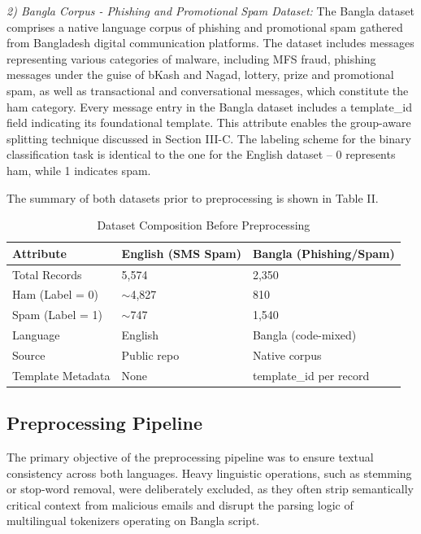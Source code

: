 \documentclass[journal]{IEEEtran}
\begin{document}
\textit{2) Bangla Corpus - Phishing and Promotional Spam Dataset:} The
Bangla dataset comprises a native language corpus of phishing and
promotional spam gathered from Bangladesh digital communication
platforms. The dataset includes messages representing various
categories of malware, including MFS fraud, phishing messages under the
guise of bKash and Nagad, lottery, prize and promotional spam, as well
as transactional and conversational messages, which constitute the ham
category. Every message entry in the Bangla dataset includes a template\_id field indicating its foundational template. This attribute enables the group-aware
splitting technique discussed in Section III-C. The labeling scheme for
the binary classification task is identical to the one for the English
dataset -- 0 represents ham, while 1 indicates spam.

The summary of both datasets prior to preprocessing is shown in Table
II.

\begin{table}[htbp]
\caption{Dataset Composition Before Preprocessing}
\label{tab:dataset_raw}
\centering
\begin{tabular}{lll}
\toprule
\textbf{Attribute} & \textbf{English (SMS Spam)} & \textbf{Bangla (Phishing/Spam)} \\
\midrule
Total Records & 5,574 & 2,350 \\
Ham (Label = 0) & $\sim$4,827 & 810 \\
Spam (Label = 1) & $\sim$747 & 1,540 \\
Language & English & Bangla (code-mixed) \\
Source & Public repo \cite{ref1} & Native corpus \\
Template Metadata & None & template\_id per record \\
\bottomrule
\end{tabular}
\end{table}

\subsection{Preprocessing Pipeline}

The primary objective of the preprocessing pipeline was to ensure textual consistency across both languages. Heavy linguistic operations, such as stemming or stop-word removal, were deliberately excluded, as they often strip semantically critical context from malicious emails and disrupt the parsing logic of multilingual tokenizers operating on Bangla script.
\end{document}
